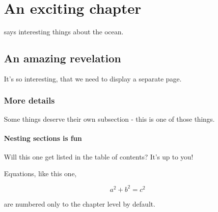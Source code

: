 \chapter{An exciting chapter}
\citet{Munk1950} says interesting things about the ocean. 
\newpage
\section{An amazing revelation}
It's so interesting, that we need to display a separate page.

\subsection{More details}
Some things deserve their own subsection - this is one of those things.

\subsubsection{Nesting sections is fun}
Will this one get listed in the table of contents? It's up to you!

Equations, like this one,

\begin{equation}
a^{2} + b^{2} = c^{2}
\end{equation}


 are numbered only to the chapter level by default.